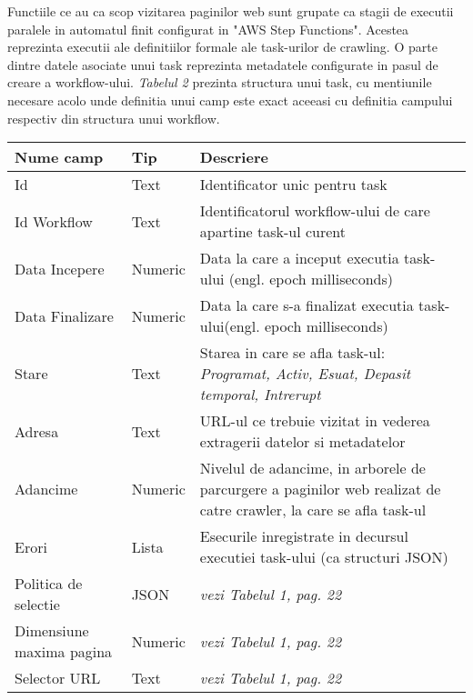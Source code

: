 Functiile ce au ca scop vizitarea paginilor web sunt grupate ca stagii de executii paralele in automatul finit configurat in "AWS Step Functions". Acestea reprezinta executii ale definitiilor formale ale task-urilor de crawling. O parte dintre datele asociate unui task reprezinta metadatele configurate in pasul de creare a workflow-ului. \textit{Tabelul 2} prezinta structura unui task, cu mentiunile necesare acolo unde definitia unui camp este exact aceeasi cu definitia campului respectiv din structura unui workflow.

\begin{table}[h]
	\centering
    \begin{tabular}{|M{2.5cm}|M{1.6cm}|M{9cm}|}
    	\hline 
    	Nume camp & Tip & Descriere \\ \hline
    	
    	Id & Text & Identificator unic pentru task \\ \hline
    	
    	Id Workflow & Text & Identificatorul workflow-ului de care apartine task-ul curent \\ \hline
    	
    	Data Incepere & Numeric & Data la care a inceput executia task-ului (engl. epoch milliseconds) \\ \hline
    	
    	Data Finalizare & Numeric & Data la care s-a finalizat executia task-ului(engl. epoch milliseconds) \\ \hline
    	
    	Stare & Text & Starea in care se afla task-ul: \textit{Programat, Activ, Esuat, Depasit temporal, Intrerupt} \\ \hline
    	
		Adresa & Text & URL-ul ce trebuie vizitat in vederea extragerii datelor si metadatelor \\ \hline    	
    	
    	Adancime & Numeric & Nivelul de adancime, in arborele de parcurgere a paginilor web realizat de catre crawler, la care se afla task-ul \\ \hline
    	
    	Erori & Lista & Esecurile inregistrate in decursul executiei task-ului (ca structuri JSON) \\ \hline
    	
    	Politica de selectie & JSON & \textit{vezi Tabelul 1, pag. 22} \\ \hline
    	
    	Dimensiune maxima pagina & Numeric & \textit{vezi Tabelul 1, pag. 22} \\ \hline
    	
    	Selector URL & Text & \textit{vezi Tabelul 1, pag. 22} \\ \hline
    	
    \end{tabular}
\end{table}
\clearpage

